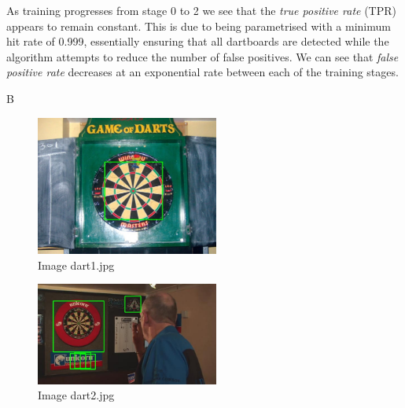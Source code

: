 \documentclass[conference]{IEEEtran}
\begin{document}

As training progresses from stage 0 to 2 we see that the \textit{true positive rate} (TPR) appears to remain constant. This is due to being parametrised with a minimum hit rate of 0.999, essentially ensuring that all dartboards are detected while the algorithm attempts to reduce the number of false positives. We can see that \textit{false positive rate} decreases at an exponential rate between each of the training stages.

B

\begin{figure}[ht!]
	\centering
	\includegraphics[width=60mm]{img/Viola_Jones_Darts/detected_dart1.jpg}
	\caption{Image dart1.jpg \label{img_dart_1}}
\end{figure}

\begin{figure}[ht!]
	\centering
	\includegraphics[width=60mm]{img/Viola_Jones_Darts/detected_dart2.jpg}
	\caption{Image dart2.jpg \label{img_dart_2}}
\end{figure}
\end{document}

